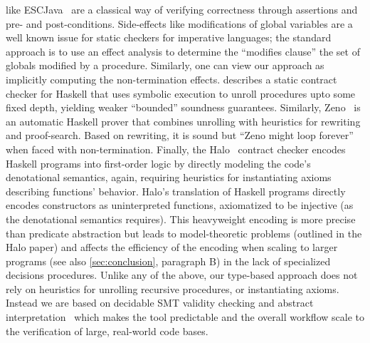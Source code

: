 like ESCJava~\cite{ESCJava} are a classical way of verifying 
correctness through assertions and pre- and post-conditions. 
%
Side-effects like modifications of global variables are a 
well known issue for static checkers for imperative languages;
the standard approach is to use an effect analysis to determine
the ``modifies clause'' \ie the set of globals modified by a procedure.
%
Similarly, one can view our approach as implicitly computing 
the non-termination effects.
%
%
%
\cite{XuPOPL09} describes a static contract checker for 
Haskell that uses symbolic execution to unroll procedures
upto some fixed depth, yielding weaker ``bounded'' soundness
guarantees.
% 
%
Similarly, Zeno~\cite{ZENO} is an automatic Haskell 
prover that combines unrolling with heuristics for rewriting
and proof-search. 
Based on rewriting, it is sound but 
``Zeno might loop forever'' when faced with 
non-termination.
%
Finally, the Halo~\cite{halo} contract checker encodes 
Haskell programs into first-order logic by directly 
modeling the code's denotational semantics,
again, requiring heuristics for instantiating axioms 
describing functions' behavior. Halo's translation of Haskell
programs directly encodes constructors as uninterpreted functions,
axiomatized to be injective (as the denotational semantics requires).
This heavyweight encoding is more precise than predicate abstraction 
but leads to model-theoretic problems (outlined in the Halo paper) and 
affects the efficiency of the encoding when scaling to larger programs 
(see also \ref{sec:conclusion}, paragraph B) in the lack of specialized 
decisions procedures.
%
Unlike any of the above, our type-based approach does 
not rely on heuristics for unrolling recursive procedures, 
or instantiating axioms. 
%
Instead we are based on decidable SMT validity 
checking and abstract interpretation~\cite{LiquidPLDI08} 
which makes the tool predictable and the overall workflow
scale to the verification of large, real-world
code bases.




